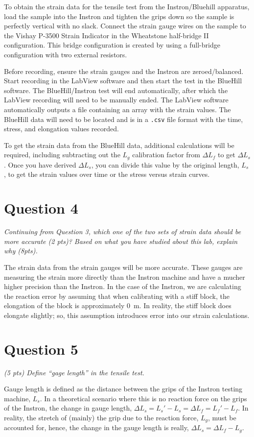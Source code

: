 \documentclass[12 pt]{article}
\begin{document}
To obtain the strain data for the tensile test from the Instron/Bluehill apparatus, load the sample into the Instron and tighten the grips down so the sample is perfectly vertical with no slack. Connect the strain gauge wires on the sample to the Vishay P-3500 Strain Indicator in the Wheatstone half-bridge II configuration. This bridge configuration is created by using a full-bridge configuration with two external resistors.

Before recording, ensure the strain gauges and the Instron are zeroed/balanced. Start recording in the LabView software and then start the test in the BlueHill software. The BlueHill/Instron test will end automatically, after which the LabView recording will need to be manually ended. The LabView software automatically outputs a file containing an array with the strain values. The BlueHill data will need to be located and is in a \texttt{.csv} file format with the time, stress, and elongation values recorded.

To get the strain data from the BlueHill data, additional calculations will be required, including subtracting out the $L_g$ calibration factor from ${\Delta}L_f$ to get ${\Delta}L_s$. Once you have derived ${\Delta}L_s$, you can divide this value by the original length, $L_s$, to get the strain values over time or the stress versus strain curves.

\section*{Question 4} \label{question_4}
\textit{Continuing from Question 3, which one of the two sets of strain data should be more accurate (2 pts)?  Based on what you have studied about this lab, explain why (8pts).}

The strain data from the strain gauges will be more accurate. These gauges are measuring the strain more directly than the Instron machine and have a mucher higher precision than the Instron. In the case of the Instron, we are calculating the reaction error by assuming that when calibrating with a stiff block, the elongation of the block is approximately \qty{0}{m}. In reality, the stiff block does elongate slightly; so, this assumption introduces error into our strain calculations.

\section*{Question 5} \label{question_5}
\textit{(5 pts) Define ``gage length'' in the tensile test.}

Gauge length is defined as the distance between the grips of the Instron testing machine, $L_s$. In a theoretical scenario where this is no reaction force on the grips of the Instron, the change in gauge length, ${\Delta}L_s=L_s'-L_s={\Delta}L_f=L_f'-L_f$. In reality, the stretch of (mainly) the grip due to the reaction force, $L_g$, must be accounted for, hence, the change in the gauge length is really, ${\Delta}L_s={\Delta}L_f-L_g$.
\end{document}
